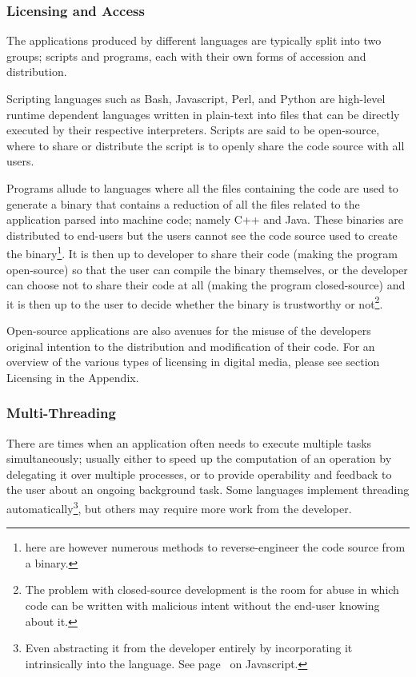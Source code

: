 \subsubsection{Licensing and Access}

The applications produced by different languages are typically split into two groups; scripts and programs, each with their own forms of accession and distribution.

Scripting languages such as Bash, Javascript, Perl, and Python\citep{vanrossum2010python} are high-level runtime dependent languages written in plain-text into files that can be directly executed by their respective interpreters. Scripts are said to be open-source, where to share or distribute the script is to openly share the code source with all users.

Programs allude to languages where all the files containing the code are used to generate a binary that contains a reduction of all the files related to the application parsed into machine code; namely C++ and Java. These binaries are distributed to end-users but the users cannot see the code source used to create the binary\footnote{here are however numerous methods to reverse-engineer the code source from a binary.}. It is then up to developer to share their code (making the program open-source) so that the user can compile the binary themselves, or the developer can choose not to share their code at all (making the program closed-source) and it is then up to the user to decide whether the binary is trustworthy or not\footnote{The problem with closed-source development is the room for abuse in which code can be written with malicious intent without the end-user knowing about it.}.

Open-source applications are also avenues for the misuse of the developers original intention to the distribution and modification of their code. For an overview of the various types of licensing in digital media, please see section Licensing in the Appendix.

\subsubsection{Multi-Threading}

There are times when an application often needs to execute multiple tasks simultaneously; usually either to speed up the computation of an operation by delegating it over multiple processes, or to provide operability and feedback to the user about an ongoing background task. Some languages implement threading automatically\footnote{Even abstracting it from the developer entirely by incorporating it intrinsically into the language. See page~\pageref{ref:haplo:javaover} on Javascript.}, but others may require more work from the developer.

